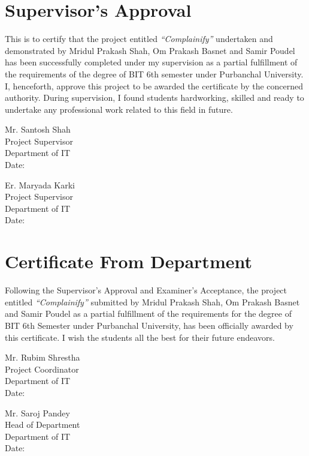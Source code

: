 \documentclass[12pt,a4paper]{report}
\begin{document}
\chapter*{Supervisor's Approval}

This is to certify that the project entitled \textit{``Complainify''} undertaken and demonstrated by Mridul Prakash Shah, Om Prakash Basnet and Samir Poudel has been successfully completed under my supervision as a partial fulfillment of the requirements of the degree of BIT 6th semester under Purbanchal University. I, henceforth, approve this project to be awarded the certificate by the concerned authority. During supervision, I found students hardworking, skilled and ready to undertake any professional work related to this field in future.

\vspace{2cm}
\begin{minipage}{0.45\textwidth}
Mr. Santosh Shah\\
Project Supervisor\\
Department of IT\\
Date:
\end{minipage}
\hfill
\begin{minipage}{0.45\textwidth}
Er. Maryada Karki\\
Project Supervisor\\
Department of IT\\
Date:
\end{minipage}

\chapter*{Certificate From Department}

Following the Supervisor's Approval and Examiner's Acceptance, the project entitled \textit{``Complainify''} submitted by Mridul Prakash Shah, Om Prakash Basnet and Samir Poudel as a partial fulfillment of the requirements for the degree of BIT 6th Semester under Purbanchal University, has been officially awarded by this certificate. I wish the students all the best for their future endeavors.

\vspace{2cm}
\begin{minipage}{0.45\textwidth}
Mr. Rubim Shrestha\\
Project Coordinator\\
Department of IT\\
Date:
\end{minipage}
\hfill
\begin{minipage}{0.45\textwidth}
Mr. Saroj Pandey\\
Head of Department\\
Department of IT\\
Date:
\end{minipage}
\end{document}
